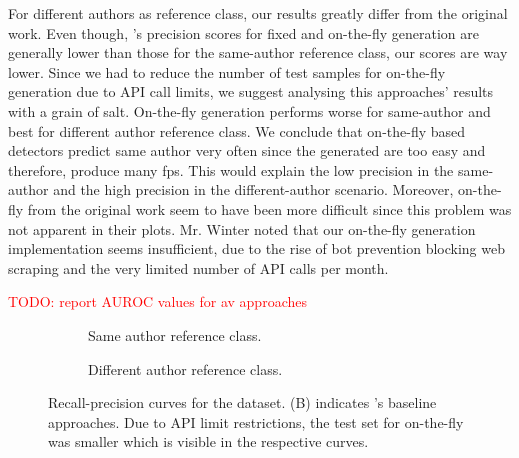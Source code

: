For different authors as reference class, our results greatly differ from the original work.
Even though, \citet{koppel_determining_2014}'s precision scores for fixed and on-the-fly \imp{} generation are generally lower than those for the same-author reference class, our scores are way lower.
Since we had to reduce the number of test samples for on-the-fly \imp{} generation due to API call limits, we suggest analysing this approaches' results with a grain of salt.
On-the-fly \imp{} generation performs worse for same-author and best for different author reference class.
We conclude that on-the-fly based detectors predict same author very often since the generated \imps{} are too easy and therefore, produce many \acp{fp}.
This would explain the low precision in the same-author and the high precision in the different-author scenario.
Moreover, on-the-fly \imps{} from the original work seem to have been more difficult since this problem was not apparent in their plots.
Mr. Winter noted that our on-the-fly \imp{} generation implementation seems insufficient, due to the rise of bot prevention blocking web scraping and the very limited number of API calls per month.




\textcolor{red}{TODO: report AUROC values for av approaches}
\begin{figure}[htbp]
  \centering
  \begin{subfigure}[b]{0.595\textwidth}
    \centering
    
    \caption{Same author reference class. }
    \label{fig:blog_same_author}
  \end{subfigure}
  \hfill
  \begin{subfigure}[b]{0.595\textwidth}
    \centering
    
    \caption{Different author reference class.}
    \label{fig:blog_diff_author}
  \end{subfigure}
  \caption{Recall-precision curves for the \dataBlog{} dataset. 
  (B) indicates \citet{koppel_determining_2014}'s baseline approaches.
  Due to API limit restrictions, the test set for on-the-fly was smaller which is visible in the respective curves.}
  \label{fig:diff_imp_gen_blog}
\end{figure}


